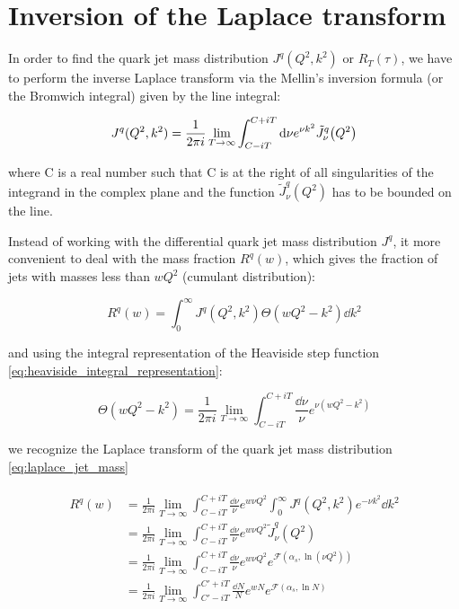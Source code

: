 \documentclass[../main.tex]{subfiles}
\begin{document}
\section{Inversion of the Laplace transform}

In order to find the quark jet mass distribution $J^q(Q^2,k^2)$ or $R_T(\tau)$, we have to perform the inverse Laplace transform via 
the Mellin's inversion formula (or the Bromwich integral) given by the line integral: 

\begin{equation} \label{eq:inverse_laplace}
    J^q(Q^2,k^2) = \frac{1}{2\pi i} \lim_{T \to \infty}\int_{C-iT}^{C+iT} \dd \nu e^{\nu k^2} \tilde{J}^q_\nu \qty(Q^2)
\end{equation}

where C is a real number such that C is at the right of all singularities of the integrand in the complex plane and
the function $\tilde{J}^q_\nu(Q^2)$ has to be bounded on the line.

Instead of working with the differential quark jet mass distribution $J^q$, it more convenient to deal with
the mass fraction $R^q(w)$, which gives the fraction of jets with masses less than $wQ^2$ (cumulant distribution):

\begin{equation}\label{eq:jet mass fraction}
    R^q(w) = \int_0^\infty J^q(Q^2,k^2)\Theta(wQ^2-k^2) \dd k^2
\end{equation}

and using the integral representation of the Heaviside step function \cref{eq:heaviside_integral_representation}:

\begin{equation}
    \Theta(wQ^2-k^2) = \frac{1}{2\pi i} \lim_{T \to \infty}\int_{C-iT}^{C+iT} \frac{\dd \nu}{\nu} e^{\nu (wQ^2-k^2)} 
\end{equation}

we recognize the Laplace transform of the quark jet mass distribution \cref{eq:laplace_jet_mass}

\begin{align}
    \begin{split}\label{eq:Rw mass fraction}
        R^q(w) &= \frac{1}{2\pi i} \lim_{T \to \infty} \int_{C-iT}^{C+iT} \frac{\dd \nu}{\nu} e^{w \nu Q^2} \int_0^\infty J^q(Q^2,k^2) e^{-\nu k^2} \dd k^2 \\
        &= \frac{1}{2\pi i} \lim_{T \to \infty} \int_{C-iT}^{C+iT} \frac{\dd \nu}{\nu} e^{w \nu Q^2} \tilde{J}^q_\nu(Q^2) \\
        &= \frac{1}{2\pi i} \lim_{T \to \infty} \int_{C-iT}^{C+iT} \frac{\dd \nu}{\nu} e^{w \nu Q^2} e^{\mathcal{F}(\alpha_s,\ln(\nu Q^2))}\\
        &= \frac{1}{2\pi i} \lim_{T \to \infty} \int_{C'-iT}^{C'+iT} \frac{\dd N}{N} e^{w N} e^{\mathcal{F}(\alpha_s,\ln N)}
    \end{split}
\end{align}
\end{document}
